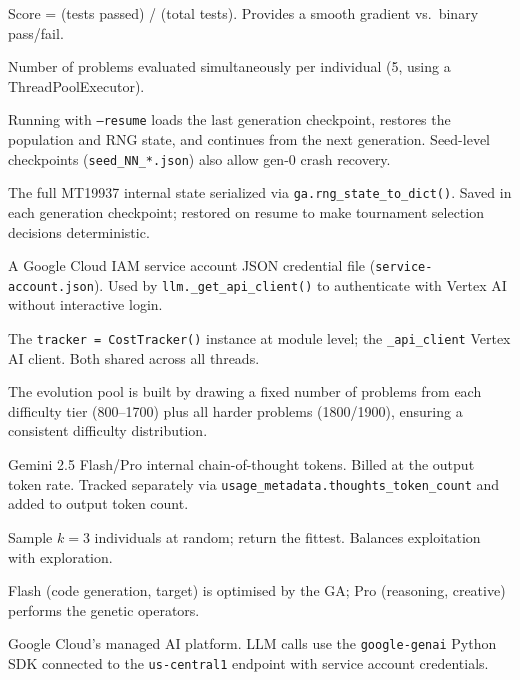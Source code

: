 \documentclass[11pt,a4paper]{report}
\newcommand{\fn}[1]{\texttt{#1}}
\begin{document}
\begin{description}[style=nextline, leftmargin=3cm, itemsep=3pt]
\item[Partial credit] Score = (tests passed) / (total tests).  Provides a smooth
  gradient vs.\ binary pass/fail.

\item[PARALLEL\_EVALS] Number of problems evaluated simultaneously per individual
  (5, using a ThreadPoolExecutor).

\item[Resume] Running with \fn{--resume} loads the last generation checkpoint,
  restores the population and RNG state, and continues from the next generation.
  Seed-level checkpoints (\fn{seed\_NN\_*.json}) also allow gen-0 crash recovery.

\item[RNG state] The full MT19937 internal state serialized via
  \fn{ga.rng\_state\_to\_dict()}.  Saved in each generation checkpoint; restored on
  resume to make tournament selection decisions deterministic.

\item[Service account] A Google Cloud IAM service account JSON credential file
  (\fn{service-account.json}).  Used by \fn{llm.\_get\_api\_client()} to authenticate
  with Vertex AI without interactive login.

\item[Singleton] The \fn{tracker = CostTracker()} instance at module level; the
  \fn{\_api\_client} Vertex AI client.  Both shared across all threads.

\item[Stratified split] The evolution pool is built by drawing a fixed number of
  problems from each difficulty tier (800--1700) plus all harder problems (1800/1900),
  ensuring a consistent difficulty distribution.

\item[Thinking tokens] Gemini 2.5 Flash/Pro internal chain-of-thought tokens.
  Billed at the output token rate.  Tracked separately via
  \fn{usage\_metadata.thoughts\_token\_count} and added to output token count.

\item[Tournament selection] Sample $k=3$ individuals at random; return the fittest.
  Balances exploitation with exploration.

\item[Two-model architecture] Flash (code generation, target) is optimised by the GA;
  Pro (reasoning, creative) performs the genetic operators.

\item[Vertex AI] Google Cloud's managed AI platform.  LLM calls use the
  \fn{google-genai} Python SDK connected to the \fn{us-central1} endpoint with
  service account credentials.

\end{description}
\end{document}
